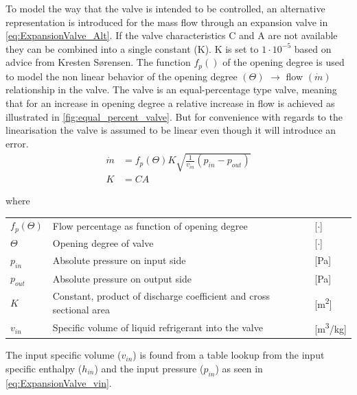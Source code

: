 \smallskip
To model the way that the valve is intended to be controlled, an alternative representation is introduced for the mass flow through an expansion valve in \cref{eq:ExpansionValve_Alt}. If the valve characteristics C and A are not available they can be combined into a single constant (K). K is set to $1 \cdot 10^{-5}$ based on advice from Kresten Sørensen. The function $f_p()$ of the opening degree is used to model the non linear behavior of the opening degree $( \Theta )$ $\rightarrow$ flow $( \dot{m} )$ relationship in the valve. The valve is an equal-percentage type valve, meaning that for an increase in opening degree a relative increase in flow is achieved as illustrated in \cref{fig:equal_percent_valve}. But for convenience with regards to the linearisation the valve is assumed to be linear even though it will introduce an error.
\begin{equation} \label{eq:ExpansionValve_Alt}
	\begin{split}
		\dot{m} & = f_p(\Theta) K  \sqrt{\frac{1}{v_{in}} (p_{in} - p_{out})} \\
		K       & = C A
	\end{split}
\end{equation}

where
\smallskip
\begin{center}
	\begin{tabular}{l p{10cm} l}
		$f_p(\Theta)$ & Flow percentage as function of opening degree                       & [$\cdot$]          \\
		$ \Theta $    & Opening degree of valve                                             & [$ \cdot $]        \\
		$p_{in}$      & Absolute pressure on input side                                     & [\si{Pa}]          \\
		$p_{out}$     & Absolute pressure on output side                                    & [\si{Pa}]          \\
		$K$           & Constant, product of discharge coefficient and cross sectional area & [\si{m^2}]         \\
		$v_{in}$      & Specific volume of liquid refrigerant into the valve                & [\si{m^3}/\si{kg}]
	\end{tabular}
\end{center}

\medskip
The input specific volume ($v_{in}$) is found from a table lookup from the input specific enthalpy ($h_{in}$) and the input pressure ($p_{in}$) as seen in \cref{eq:ExpansionValve_vin}.

